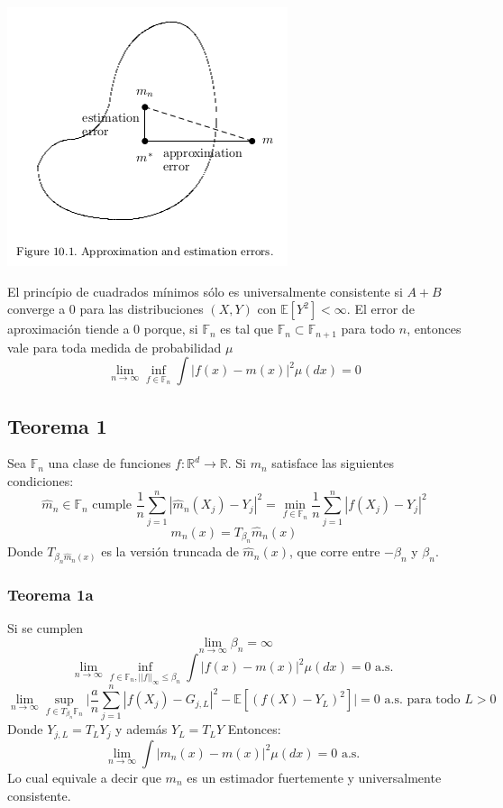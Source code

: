 \documentclass[12pt, a4paper]{article}
\begin{document}
\includegraphics[scale=0.65]{teorema-visual.png}


El princípio de cuadrados mínimos sólo es universalmente consistente si $A+B$ converge a 0 para las distribuciones $(X,Y)$ con $\mathds{E}[Y^2]<\infty$.
El error de aproximación tiende a 0 porque, si $\mathds{F}_n$ es tal que $\mathds{F}_n \subset \mathds{F}_{n+1}$ para todo $n$, entonces vale para toda medida de probabilidad $\mu$
$$
\mathop{lim}_{n\rightarrow\infty}
\mathop{inf}_{f\in\mathds{F}_n}
\int|f(x)-m(x)|^2 \mu(dx)=0
$$
\subsection{Teorema 1}
Sea $\mathds{F}_n$ una clase de funciones $f:\mathds{R}^d\rightarrow\mathds{R}$. Si $m_n$ satisface las siguientes condiciones:
$$
\hat{m}_n \in \mathds{F}_n 
\text{ cumple }
\frac{1}{n} \sum_{j=1}^n | \hat{m}_n(X_j) -Y_j |^2 
= 
\mathop{min}_{f\in\mathds{F}_n}
\frac{1}{n} \sum_{j=1}^n | f(X_j) -Y_j |^2
$$
$$
m_n(x)=T_{\beta_n} \hat{m}_n(x)
$$
Donde $T_{\beta_n \hat{m}_n(x)}$ es la versión truncada de $\hat{m}_n(x)$, que corre entre $-\beta_n$ y $\beta_n$.
\subsubsection{Teorema 1a}
Si se cumplen
$$
\mathop{lim}_{n\rightarrow\infty} \beta_n = \infty
$$
$$
\mathop{lim}_{n\rightarrow\infty} 
\mathop{inf}_{f\in\mathds{F}_n, ||f||_{\infty}  \leq \beta_n} 
\int
|f(x)-m(x)|^2 \mu(dx)=0
\text{ a.s. }
$$
$$
\mathop{lim}_{n\rightarrow\infty} 
\mathop{sup}_{f\in T_{\beta_n}\mathds{F}_n} 
\Bigg|
\frac{a}{n} \sum_{j=1}^n |f(X_j)-G_{j,L}|^2
-
\mathds{E}[(f(X)-Y_L)^2]
\Bigg| = 0
\text{ a.s. para todo $L>0$}
$$
Donde $Y_{j,L}=T_L{Y_j}$ y además $Y_L=T_L{Y}$
Entonces:
$$
\mathop{lim}_{n\rightarrow\infty} 
\int |m_n(x)-m(x)|^2 \mu(dx)
= 0
\text{ a.s. }$$
Lo cual equivale a decir que $m_n$ es un estimador fuertemente y universalmente consistente.
\end{document}
